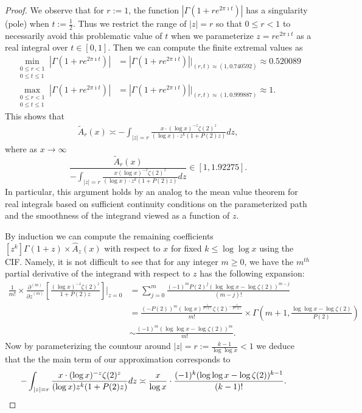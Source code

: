 \documentclass[11pt,reqno,a4letter]{article}
\numberwithin{figure}{section}
\numberwithin{table}{section}
\theoremstyle{plain}
\numberwithin{theorem}{section}
\theoremstyle{definition}
\begin{document}
\begin{proof}
We observe that for $r := 1$, the function $|\Gamma(1+re^{2\pi\imath t})|$ has a 
singularity (pole) when $t := \frac{1}{2}$. Thus we restrict the range of $|z| = r$ 
so that $0 \leq r < 1$ to necessarily avoid this problematic value of $t$ when 
we parameterize $z = r e^{2\pi\imath t}$ as a real integral over $t \in [0, 1]$. 
Then we can compute the finite extremal values as 
\begin{align*} 
\min\limits_{\substack{0 \leq r < 1 \\ 0 \leq t \leq 1}} |\Gamma(1+re^{2\pi\imath t})| & = 
     |\Gamma(1+re^{2\pi\imath t})| \Biggr\rvert_{(r,t) \approx (1, 0.740592)} \approx 
     0.520089 \\ 
\max\limits_{\substack{0 \leq r < 1 \\ 0 \leq t \leq 1}} |\Gamma(1+re^{2\pi\imath t})| & = 
     |\Gamma(1+re^{2\pi\imath t})| \Biggr\rvert_{(r,t) \approx (1, 0.999887)} \approx 1. 
\end{align*} 
This shows that 
\begin{align} 
\label{eqn_WideTildeArx_CountourIntDef_v2} 
\widetilde{A}_r(x) \asymp 
     -\int_{|z|=r} \frac{x \cdot (\log x)^{-z} \zeta(2)^{z}}{(\log x) \cdot 
     z^{k} (1 + P(2) z)} dz, 
\end{align} 
where as $x \rightarrow \infty$ 
\[
\frac{\widetilde{A}_r(x)}{-\int_{|z|=r} \frac{x (\log x)^{-z} \zeta(2)^{z}}{(\log x) \cdot 
     z^{k} (1 + P(2) z)} dz} \in [1, 1.92275]. 
\] 
In particular, this argument holds by an analog to the mean value theorem for real integrals 
based on sufficient continuity conditions on the parameterized path and the 
smoothness of the integrand viewed as a function of $z$.  

By induction we can compute the remaining coefficients 
$[z^k] \Gamma(1+z) \times \widehat{A}_z(x)$ with respect to 
$x$ for fixed $k \leq \log\log x$ using the CIF. 
Namely, it is not difficult to see that for any integer $m \geq 0$, 
we have the $m^{th}$ partial derivative of the integrand with respect to $z$ 
has the following expansion: 
\begin{align*} 
\frac{1}{m!} \times \frac{\partial^{(m)}}{{\partial z}^{(m)}}\left[ 
     \frac{(\log x)^{-z} \zeta(2)^{z}}{1 + P(2) z}\right] \Biggr\rvert_{z=0} & = 
     \sum_{j=0}^{m} \frac{(-1)^{m} P(2)^{j} (\log\log x - \log\zeta(2))^{m-j}}{(m-j)!} \\ 
     & = 
     \frac{(-P(2))^{m} (\log x)^{\frac{1}{P(2)}} \zeta(2)^{-\frac{1}{P(2)}}}{m!} \times 
     \Gamma\left(m+1, \frac{\log\log x - \log\zeta(2)}{P(2)}\right) \\ 
     & \sim \frac{(-1)^m (\log\log x -\log\zeta(2))^{m}}{m!}. 
\end{align*} 
Now by parameterizing the countour around $|z| = r := \frac{k-1}{\log\log x} < 1$ we 
deduce that the the main term of our approximation corresponds to 
\begin{align*} 
-\int_{|z|=r} \frac{x \cdot (\log x)^{-z} \zeta(2)^{z}}{(\log x) z^{k} (1 + P(2) z)} dz & \asymp 
     \frac{x}{\log x} \cdot \frac{(-1)^{k} (\log\log x - \log\zeta(2))^{k-1}}{(k-1)!}. 
     \qedhere 
\end{align*} 
\end{proof} 
\end{document}
